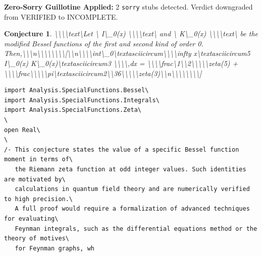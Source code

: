 \documentclass[12pt,a4paper]{article}
\newtheorem{conjecture}{Conjecture}
\begin{document}
\textcolor{sorryred}{\textbf{Zero-Sorry Guillotine Applied:} 2 \texttt{sorry} stubs detected. Verdict downgraded from VERIFIED to INCOMPLETE.}

\begin{conjecture}
\textbackslash{}\textbackslash{}\textbackslash{}\textbackslash{}text\textbackslash{}{Let \textbackslash{}} I\textbackslash{}_0(x) \textbackslash{}\textbackslash{}\textbackslash{}\textbackslash{}text\textbackslash{}{ and \textbackslash{}} K\textbackslash{}_0(x) \textbackslash{}\textbackslash{}\textbackslash{}\textbackslash{}text\textbackslash{}{ be the modified Bessel functions of the first and second kind of order 0. Then,\textbackslash{}}\textbackslash{}\textbackslash{}n\textbackslash{}\textbackslash{}\textbackslash{}\textbackslash{}\textbackslash{}\textbackslash{}\textbackslash{}\textbackslash{}[\textbackslash{}\textbackslash{}n\textbackslash{}\textbackslash{}\textbackslash{}\textbackslash{}int\textbackslash{}_0\textbackslash{}textasciicircum{}\textbackslash{}\textbackslash{}\textbackslash{}\textbackslash{}infty x\textbackslash{}textasciicircum{}5 I\textbackslash{}_0(x) K\textbackslash{}_0(x)\textbackslash{}textasciicircum{}3 \textbackslash{}\textbackslash{}\textbackslash{}\textbackslash{},dx = \textbackslash{}\textbackslash{}\textbackslash{}\textbackslash{}frac\textbackslash{}{1\textbackslash{}}\textbackslash{}{2\textbackslash{}}\textbackslash{}\textbackslash{}\textbackslash{}\textbackslash{}zeta(5) + \textbackslash{}\textbackslash{}\textbackslash{}\textbackslash{}frac\textbackslash{}{\textbackslash{}\textbackslash{}\textbackslash{}\textbackslash{}pi\textbackslash{}textasciicircum{}2\textbackslash{}}\textbackslash{}{36\textbackslash{}}\textbackslash{}\textbackslash{}\textbackslash{}\textbackslash{}zeta(3)\textbackslash{}\textbackslash{}n\textbackslash{}\textbackslash{}\textbackslash{}\textbackslash{}\textbackslash{}\textbackslash{}\textbackslash{}\textbackslash{}]
\end{conjecture}

\begin{lstlisting}[caption={Lean 4 Sketch (v14 Galois)}]
import Analysis.SpecialFunctions.Bessel\
import Analysis.SpecialFunctions.Integrals\
import Analysis.SpecialFunctions.Zeta\
\
open Real\
\
/- This conjecture states the value of a specific Bessel function moment in terms of\
   the Riemann zeta function at odd integer values. Such identities are motivated by\
   calculations in quantum field theory and are numerically verified to high precision.\
   A full proof would require a formalization of advanced techniques for evaluating\
   Feynman integrals, such as the differential equations method or the theory of motives\
   for Feynman graphs, wh
\end{lstlisting}
\end{document}
